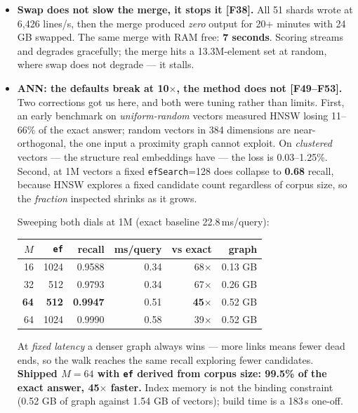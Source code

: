 \documentclass[10pt,a4paper]{article}
\newcommand{\F}[1]{\textcolor{blue!55!black}{\footnotesize[#1]}}
\begin{document}
\begin{itemize}
\textbf{Every one of these produced a byte-identical submission} (SHA-256 \texttt{066de46d\ldots},
13,336,711 lines) --- the gate the work was held to, since a performance change that alters the
output is a defect, not an optimisation. The 2-worker row is the configuration that thrashed:
$\sim$140{,}000 blocks/s of swap I/O with all 32 cores 75--100\% \emph{idle}.
\item \textbf{Swap does not slow the merge, it stops it \F{F38}.} All 51 shards wrote at 6,426
lines/s, then the merge produced \emph{zero} output for 20+ minutes with 24\,GB swapped. The same
merge with RAM free: \textbf{7 seconds}. Scoring streams and degrades gracefully; the merge hits a
13.3M-element set at random, where swap does not degrade --- it stalls.
\item \textbf{ANN: the defaults break at 10$\times$, the method does not \F{F49--F53}.} Two
corrections got us here, and both were tuning rather than limits. First, an early benchmark on
\emph{uniform-random} vectors measured HNSW losing 11--66\% of the exact answer; random vectors in
384 dimensions are near-orthogonal, the one input a proximity graph cannot exploit. On
\emph{clustered} vectors --- the structure real embeddings have --- the loss is 0.03--1.25\%.
Second, at 1M vectors a fixed \texttt{efSearch}=128 does collapse to \textbf{0.68} recall, because
HNSW explores a fixed candidate count regardless of corpus size, so the \emph{fraction} inspected
shrinks as it grows.

Sweeping both dials at 1M (exact baseline 22.8\,ms/query):

\begin{center}\footnotesize
\begin{tabular}{@{}rrrrrr@{}}
\toprule
$M$ & \texttt{ef} & recall & ms/query & vs exact & graph \\
\midrule
16 & 1024 & 0.9588 & 0.34 & 68$\times$ & 0.13 GB \\
32 & 512 & 0.9793 & 0.34 & 67$\times$ & 0.26 GB \\
\textbf{64} & \textbf{512} & \textbf{0.9947} & 0.51 & \textbf{45$\times$} & 0.52 GB \\
64 & 1024 & 0.9990 & 0.58 & 39$\times$ & 0.52 GB \\
\bottomrule
\end{tabular}
\end{center}

At \emph{fixed latency} a denser graph always wins --- more links means fewer dead ends, so the walk
reaches the same recall exploring fewer candidates. \textbf{Shipped $M{=}64$ with \texttt{ef} derived
from corpus size: 99.5\% of the exact answer, 45$\times$ faster.} Index memory is not the binding
constraint (0.52 GB of graph against 1.54 GB of vectors); build time is a 183\,s one-off.
\end{itemize}
\end{document}
